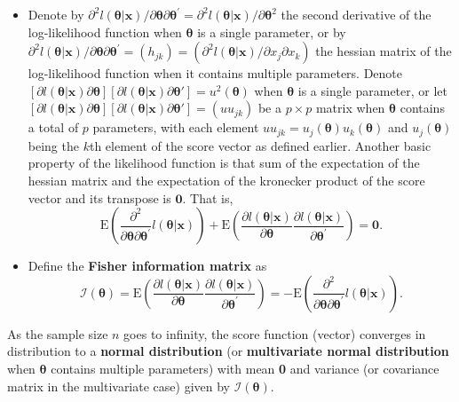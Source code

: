 \documentclass[]{book}
\theoremstyle{definition}
\theoremstyle{definition}
\theoremstyle{definition}
\theoremstyle{remark}
\begin{document}
\begin{itemize}
\item
  Denote by
  \({ \partial^2 l(\boldsymbol \theta|\mathbf{x}) }/{\partial \boldsymbol \theta\partial \boldsymbol \theta^{\prime}}={ \partial^2 l(\boldsymbol \theta|\mathbf{x}) }/{\partial \boldsymbol \theta^{2}}\)
  the second derivative of the log-likelihood function when
  \(\boldsymbol\theta\) is a single parameter, or by
  \({ \partial^2 l(\boldsymbol \theta|\mathbf{x}) }/{\partial \boldsymbol \theta\partial \boldsymbol \theta^{\prime}}=(h_{jk})=({ \partial^2 l(\boldsymbol \theta|\mathbf{x}) }/\partial x_j\partial x_k)\)
  the hessian matrix of the log-likelihood function when it contains
  multiple parameters. Denote
  \([{ \partial l(\boldsymbol \theta|\mathbf{x})}{\partial\boldsymbol \theta}][{ \partial l(\boldsymbol \theta|\mathbf{x})}{\partial\boldsymbol \theta'}]=u^2(\boldsymbol \theta)\)
  when \(\boldsymbol\theta\) is a single parameter, or let
  \([{ \partial l(\boldsymbol \theta|\mathbf{x})}{\partial\boldsymbol \theta}][{ \partial l(\boldsymbol \theta|\mathbf{x})}{\partial\boldsymbol \theta'}]=(uu_{jk})\)
  be a \(p\times p\) matrix when \(\boldsymbol\theta\) contains a total
  of \(p\) parameters, with each element
  \(uu_{jk}=u_j(\boldsymbol \theta)u_k(\boldsymbol \theta)\) and
  \(u_j(\boldsymbol \theta)\) being the \(k\)th element of the score
  vector as defined earlier. Another basic property of the likelihood
  function is that sum of the expectation of the hessian matrix and the
  expectation of the kronecker product of the score vector and its
  transpose is \(\mathbf 0\). That is,
  \[\mathrm{E} \left( \frac{ \partial^2 }{\partial \boldsymbol \theta\partial \boldsymbol \theta^{\prime}} l(\boldsymbol \theta|\mathbf{x}) \right) + \mathrm{E} \left( \frac{ \partial l(\boldsymbol \theta|\mathbf{x})}{\partial\boldsymbol \theta} \frac{ \partial l(\boldsymbol \theta|\mathbf{x})}{\partial\boldsymbol \theta^{\prime}}\right) = \mathbf 0.\]
\item
  Define the \textbf{Fisher information matrix} as \[
  \mathcal{I}(\boldsymbol \theta) = \mathrm{E} \left( \frac{ \partial
  l(\boldsymbol \theta|\mathbf{x})}{\partial \boldsymbol \theta} \frac{ \partial
  l(\boldsymbol \theta|\mathbf{x})}{\partial \boldsymbol \theta^{\prime}}
   \right) = -\mathrm{E} \left( \frac{ \partial^2}{\partial \boldsymbol \theta
  \partial \boldsymbol \theta^{\prime}} l(\boldsymbol \theta|\mathbf{x}) \right).\]
\end{itemize}

As the sample size \(n\) goes to infinity, the score function (vector)
converges in distribution to a \textbf{normal distribution} (or
\textbf{multivariate normal distribution} when \(\boldsymbol \theta\)
contains multiple parameters) with mean \textbf{0} and variance (or
covariance matrix in the multivariate case) given by
\(\mathcal{I}(\boldsymbol \theta)\).
\end{document}
